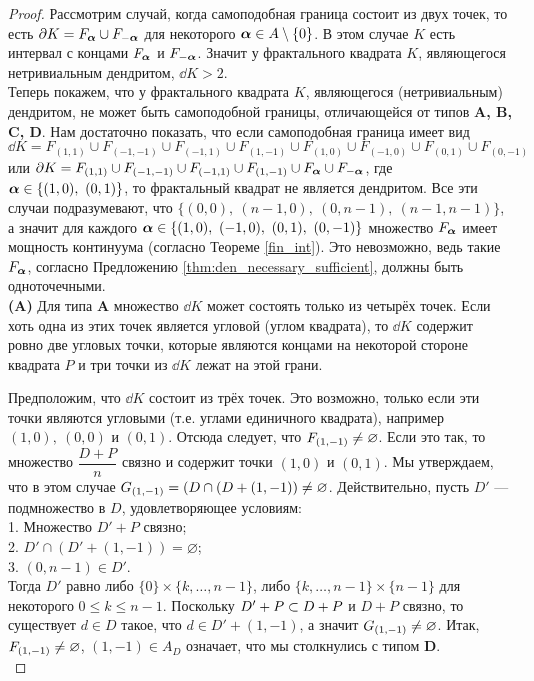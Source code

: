 \begin{proof}
Рассмотрим случай, когда самоподобная граница состоит из двух точек, то есть $\partial K=F_{\bm{\alpha}}\cup F_{-{\bm{\alpha}}}$ для некоторого ${\bm{\alpha}}\in A\setminus\{0\}$.
В этом случае $K$  есть интервал с концами $F_{\bm{\alpha}}$ и $ F_{-{\bm{\alpha}}}$.
Значит у фрактального квадрата $K$, являющегося нетривиальным дендритом, $\dd K>2$.\\

Теперь покажем, что у фрактального квадрата $K$, являющегося (нетривиальным) дендритом, не может быть самоподобной границы, отличающейся от типов {\bf A, B, C, D}.
Нам достаточно показать, что если самоподобная граница имеет вид $\dd K=F_{(1,1)}\cup F_{(-1,-1)}\cup F_{(-1,1)}\cup F_{(1,-1)}\cup F_{(1,0)}\cup F_{(-1,0)}\cup F_{(0,1)}\cup F_{(0,-1)}$ или $\partial K=F_{(1,1)}\cup F_{(-1,-1)}\cup F_{(-1,1)}\cup F_{(1,-1)}\cup F_{\bm{\alpha}}\cup F_{-{\bm{\alpha}}}$, где ${\bm{\alpha}}\in\{(1,0),\ (0,1)\}$, то фрактальный квадрат не является дендритом.
Все эти случаи подразумевают, что $\{(0,0),\ (n-1,0),\ (0,n-1),\ (n-1,n-1)\}$, а значит для каждого $\bma\in\{(1,0),\ (-1,0),\ (0,1),\ (0,-1)\}$ множество $F_{\bm{\alpha}}$ имеет мощность континуума (согласно Теореме \ref{fin_int}).
Это невозможно, ведь такие $F_{\bm{\alpha}}$, согласно Предложению \ref{thm:den_necessary_sufficient}, должны быть одноточечными.\\


{\bf (A)} Для типа {\bf A} множество $\dd K$ может состоять только из четырёх точек. 
Если хоть одна из этих точек является угловой (углом квадрата), то $\dd K$ содержит ровно две угловых точки, которые являются концами на некоторой стороне квадрата $P$ и три точки из $\dd K$ лежат на этой грани.

Предположим, что $\dd K$ состоит из трёх точек.
Это возможно, только если эти точки являются угловыми (т.е. углами единичного квадрата), например $(1,0),\ (0,0)$ и $(0,1)$.
Отсюда следует, что $F_{(1,-1)}\neq\varnothing$.
Если это так, то множество $\dfrac{D+P}{n}$ связно и содержит точки $(1,0)$ и $(0,1)$. 
Мы утверждаем, что в этом случае $G_{(1,-1)}=(D\cap (D+(1,-1))\neq\varnothing$.
Действительно, пусть $D'$ --- подмножество в $D$, удовлетворяющее условиям:\\
1. Множество $D'+P$ связно;\\
2. $D'\cap (D'+(1,-1))=\varnothing$;\\
3. $(0,n-1)\in D'$. \\
Тогда $D'$ равно либо $\{0\}\times\{k,\ldots,n-1\}$, либо $\{k,\ldots,n-1\}\times\{n-1\}$ для некоторого $0\leq k\leq n-1$.
Поскольку $D'+P\subset D+P$ и $D+P$ связно, то существует $d\in D$ такое, что $d\in D'+(1,-1)$, а значит $G_{(1,-1)}\neq\varnothing$.
Итак, $F_{(1,-1)}\neq\varnothing$, $(1,-1)\in A_D$ означает, что мы столкнулись с типом {\bf D}. \\


\end{proof}
